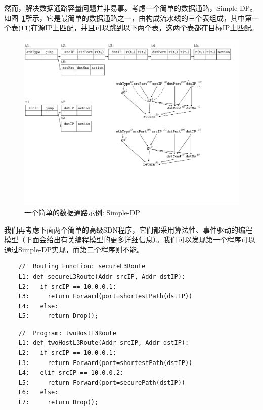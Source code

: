 \documentclass{ctexart}
\begin{document}
然而，解决数据通路容量问题并非易事。考虑一个简单的数据通路，Simple-DP。如图~\ref{cap:fig:fig1-update}所示，它是最简单的数据通路之一，由构成流水线的三个表组成，其中第一个表(\texttt{t1})在源IP上匹配，并且可以跳到以下两个表，这两个表都在目标IP上匹配。

\begin{figure}[h!]
	\centering
	\vspace{-0.1in}
	\includegraphics[scale = 0.7]{figures/figure1.pdf}
	\vspace{-0.1in}
	\caption{一个简单的数据通路示例: Simple-DP}
	\vspace{-0.1in}
	\label{cap:fig:fig1-update}
\end{figure}

我们再考虑下面两个简单的高级SDN程序，它们都采用算法性、事件驱动的编程模型（下面会给出有关编程模型的更多详细信息）。我们可以发现第一个程序可以通过Simple-DP实现，而第二个程序则不能。

{\small
	\begin{verbatim}
	//  Routing Function: secureL3Route
	L1: def secureL3Route(Addr srcIP, Addr dstIP):
	L2:   if srcIP == 10.0.0.1:
	L3:     return Forward(port=shortestPath(dstIP))
	L4:   else:
	L5:     return Drop();
	\end{verbatim}
}

{\small
	\begin{verbatim}
	//  Program: twoHostL3Route
	L1: def twoHostL3Route(Addr srcIP, Addr dstIP):
	L2:   if srcIP == 10.0.0.1:
	L3:     return Forward(port=shortestPath(dstIP)) 
	L4:   elif srcIP == 10.0.0.2:
	L5:     return Forward(port=securePath(dstIP))
	L6:   else:
	L7:     return Drop();
	\end{verbatim}
}
\end{document}
